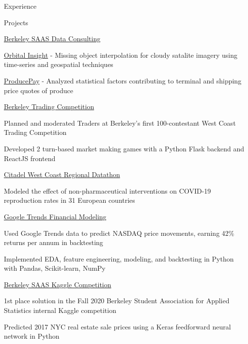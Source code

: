 \documentclass{resume} %
\begin{document}
\begin{rSection}{Experience}
\end{rSection}


\begin{rSection}{Projects}

\begin{rSubsection}{\href{https://www.producepay.com/}{Berkeley SAAS Data Consulting}}{}{}{}
    \item \href{https://orbitalinsight.com/}{Orbital Insight} - Missing object interpolation for cloudy satalite imagery using time-series and geospatial techniques
    \item \href{https://producepay.com/}{ProducePay} - Analyzed statistical factors contributing to terminal and shipping price quotes of produce
\end{rSubsection}

\begin{rSubsection}{\href{https://traders.berkeley.edu/}{Berkeley Trading Competition}}{}{}{}
    \item Planned and moderated Traders at Berkeley's first 100-contestant West Coast Trading Competition
    \item Developed 2 turn-based market making games with a Python Flask backend and ReactJS frontend
\end{rSubsection}

\begin{rSubsection}{\href{https://github.com/evilpegasus/datathon-spring-2021}{Citadel West Coast Regional Datathon}}{}{}{}
    \item Modeled the effect of non-pharmaceutical interventions on COVID-19 reproduction rates in 31 European countries
\end{rSubsection}

\begin{rSubsection}{\href{https://github.com/evilpegasus/google-trends-financial-modeling/}{Google Trends Financial Modeling}}{}{}{}
    \item Used Google Trends data to predict NASDAQ price movements, earning 42\% returns per annum in backtesting
    \item Implemented EDA, feature engineering, modeling, and backtesting in Python with Pandas, Scikit-learn, NumPy
\end{rSubsection}

\begin{rSubsection}{\href{https://www.kaggle.com/c/saas-2020-fall-cx-kaggle-compeition/}{Berkeley SAAS Kaggle Competition}}{}{}{}
    \item 1st place solution in the Fall 2020 Berkeley Student Association for Applied Statistics internal Kaggle competition
    \item Predicted 2017 NYC real estate sale prices using a Keras feedforward neural network in Python
\end{rSubsection}


\end{rSection}
\end{document}
